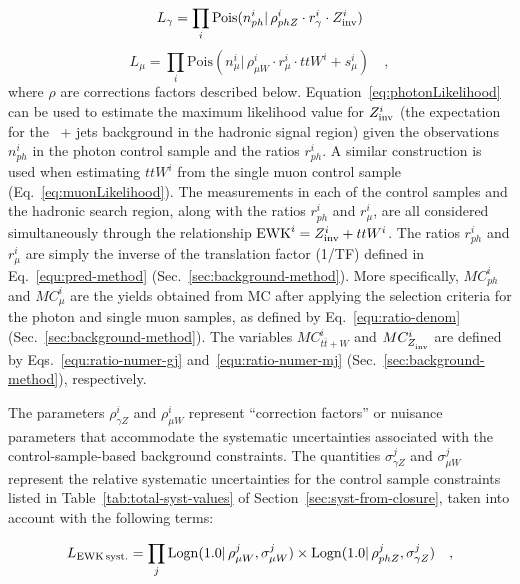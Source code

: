 \begin{equation}
\label{eq:photonLikelihood}
L_{\gamma}= \prod_i \mathrm{Pois}(n_{ph}^i |\, \rho_{phZ}^i \cdot
r_{\gamma}^{i} \cdot Z_{\rm inv}^{i})
\end{equation}
%
%
\begin{equation}
\label{eq:muonLikelihood}
L_{\mu}=\prod_i \mathrm{Pois}(n_{\mu}^i |\, \rho_{\mu W}^i \cdot
r_{\mu}^{i} \cdot ttW^{i} + s_{\mu}^i)\quad ,
\end{equation}
where $\rho$ are corrections factors described below.
Equation~\ref{eq:photonLikelihood} can be used to estimate the maximum
likelihood value for $Z_{\rm inv}^{i}$ (the expectation for the \znunu\ +
jets background in the hadronic signal region) given the observations
$n_{ph}^i$ in the photon control sample and the ratios $r_{ph}^i$. A
similar construction is used when estimating $ttW^{i}$ from the single 
muon control sample (Eq.~\ref{eq:muonLikelihood}). The measurements in 
each of the control samples and the hadronic search region, along with 
the ratios $r_{ph}^{i}$ and $r_{\mu}^{i}$, are all considered
simultaneously through the relationship $\mathrm{EWK}^i =  Z_{\rm inv}^{i} + ttW^{i}$.
The ratios $r_{ph}^{i}$ and $r_{\mu}^{i}$ are simply 
the inverse of the translation factor (1/TF) defined in 
Eq.~\ref{equ:pred-method} (Sec.~\ref{sec:background-method}). More 
specifically, $MC_{ph}^i$ and $MC_{\mu}^i$ are the yields obtained from MC
after applying the selection criteria for the photon and single muon samples, 
as defined by Eq.~\ref{equ:ratio-denom} (Sec.~\ref{sec:background-method}). 
The variables $MC_{t\bar{t}+W}^i$ and $MC_{Z_{\rm inv}^{}}^i$ are defined by 
Eqs.~\ref{equ:ratio-numer-gj} and~\ref{equ:ratio-numer-mj} 
(Sec.~\ref{sec:background-method}), respectively.

The parameters $\rho_{\gamma Z}^i$ and $\rho_{\mu
  W}^i$ represent ``correction factors'' or nuisance parameters that accommodate the
systematic uncertainties associated with the control-sample-based
background constraints.  The quantities $\sigma_{\gamma Z}^j$
and $\sigma_{\mu W}^j$ represent the relative
systematic uncertainties for the control sample constraints listed in 
Table~\ref{tab:total-syst-values} of Section~\ref{sec:syst-from-closure}, 
taken into account with the following terms:

\begin{equation}
\label{eq:ewkSyst}
L_{\rm EWK\, syst.}=\prod_j \mathrm{Logn}( 1.0 |\,\rho_{\mu W}^j,
\sigma_{\mu W}^j)\times \mathrm{Logn}( 1.0 |\,\rho_{ph Z}^j,
\sigma_{\gamma Z}^j) \quad ,
\end{equation}

